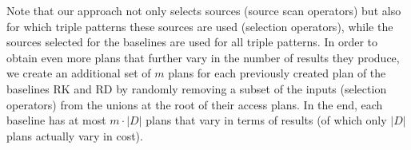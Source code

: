 Note that our approach not only selects sources (source scan
operators) but also for which triple patterns these sources are used
(selection operators), while the sources selected for the baselines
are used for all triple patterns. In order to obtain even more plans
that further vary in the number of results they produce, we create an
additional set of $m$ plans for each previously created plan of the
baselines RK and RD by
randomly removing a subset of the inputs (selection operators) from
the unions at the root of their access plans.
In the end, each baseline has at most $m \cdot |D|$ plans that vary
in terms of results (of which only $|D|$ plans actually vary in cost).


%
%


